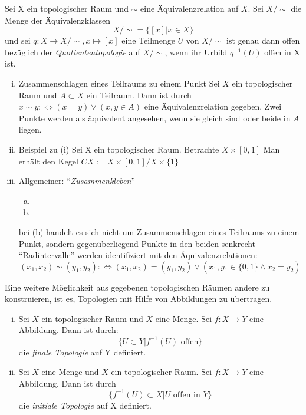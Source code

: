 \documentclass[a4paper,10pt]{scrartcl}
\renewcommand{\equiv}{\Longleftrightarrow}
\begin{document}
\begin{df}
Sei X ein topologischer Raum und $\sim$ eine Äquivalenzrelation auf $ X $.  Sei $X/\sim$ die Menge der Äquivalenzklassen 
\[
X/\sim=\{[x]|x\in X\}
\]
und sei $ q: X\to X/\sim, x\mapsto [x] $ eine Teilmenge $ U $ von $ X/\sim $ ist genau dann offen bezüglich der \emph{Quotiententopologie} auf $ X/\sim $, wenn ihr Urbild $ q^{-1}(U) $ offen in X ist.
\end{df}

\begin{ex*}
\begin{enumerate}[(i)]
\item \begin{seg}{Zusammenschlagen eines Teilraums zu einem Punkt}
Sei $ X $ ein topologischer Raum und $ A\subset X $ ein Teilraum. Dann ist durch $ x \sim y :\equiv (x=y)\lor (x,y\in A) $ eine Äquivalenzrelation gegeben.  Zwei Punkte werden als äquivalent angesehen, wenn sie gleich sind oder beide in $ A $ liegen.
\end{seg}
\item \begin{seg}{Beispiel zu (i)}
Sei X ein topologischer Raum. Betrachte $ X\times [0,1] $
\fixme[fig9]
Man erhält den Kegel $CX:=X\times[0,1]/X\times\{1\}$
\end{seg}
\item Allgemeiner: "`\emph{Zusammenkleben}"'
\begin{enumerate}[(a)]
\item \fixme[fig10]
\item \fixme[fig11]
\end{enumerate}
bei (b) handelt es sich nicht um Zusammenschlagen eines Teilraums zu einem Punkt, sondern gegenüberliegend Punkte in den beiden senkrecht "`Radintervalle"' werden identifiziert mit den Äquivalenzrelationen: \fixme[nachschauen]
\[
(x_1,x_2)\sim (y_1,y_2):\equiv (x_1,x_2)=(y_1,y_2)\lor (x_1,y_1 \in \{0,1\} \land x_2 =y_2)
\]
\end{enumerate}
\end{ex*}
Eine weitere Möglichkeit aus gegebenen topologischen Räumen andere zu konstruieren, ist es, Topologien mit Hilfe von Abbildungen zu übertragen.
\begin{df}\label{thm:2.5}
\begin{enumerate}[(i)]
\item Sei $ X $ ein topologischer Raum und $ X $ eine Menge.  Sei $ f: X\to Y$ eine Abbildung.  Dann ist durch:
\[
\{U\subset Y|f^{-1}(U) \text{ offen} \}
\]
die \emph{finale Topologie} auf Y definiert.
\item Sei $ X $ eine Menge und $ X $ ein topologischer Raum.  Sei $ f: X\to Y $ eine Abbildung.  Dann ist durch 
\[
\{ f^{-1}(U)\subset X| U \text{ offen in } Y\}
\]
die \emph{initiale Topologie} auf X definiert.
\end{enumerate}
\end{df}
\end{document}
